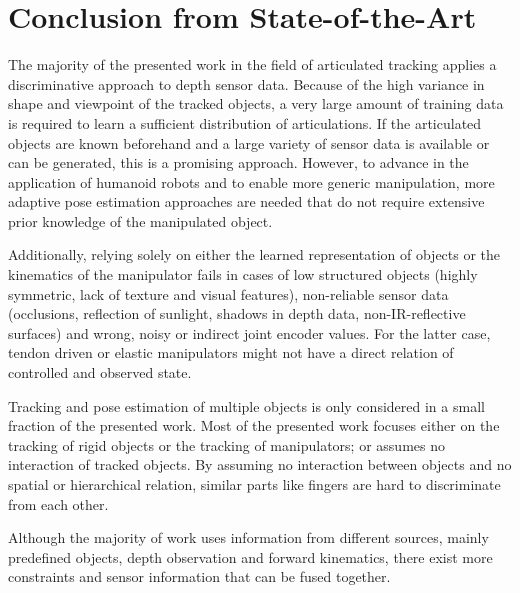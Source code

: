 \section{Conclusion from State-of-the-Art}
\label{sec:discussion}

The majority of the presented work in the field of articulated tracking applies a discriminative approach to depth sensor data. Because of the high variance in shape and viewpoint of the tracked objects, a very large amount of training data is required to learn a sufficient distribution of articulations. If the articulated objects are known beforehand and a large variety of sensor data is available or can be generated, this is a promising approach.
However, to advance in the application of humanoid robots and to enable more generic manipulation, more adaptive pose estimation approaches are needed that do not require extensive prior knowledge of the manipulated object.

Additionally, relying solely on either the learned representation of objects or the kinematics of the manipulator fails in cases of low structured objects (highly symmetric, lack of texture and visual features), non-reliable sensor data (occlusions, reflection of sunlight, shadows in depth data, non-IR-reflective surfaces) and wrong, noisy or indirect joint encoder values. For the latter case, tendon driven or elastic manipulators might not have a direct relation of controlled and observed state.

Tracking and pose estimation of multiple objects is only considered in a small fraction of the presented work. Most of the presented work focuses either on the tracking of rigid objects or the tracking of manipulators; or assumes no interaction of tracked objects. By assuming no interaction between objects and no spatial or hierarchical relation, similar parts like fingers are hard to discriminate from each other.

Although the majority of work uses information from different sources, mainly predefined objects, depth observation and forward kinematics, there exist more constraints and sensor information that can be fused together.
